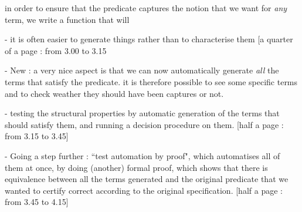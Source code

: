 in order to ensure that the predicate captures the notion that we want for \emph{any} term, we write a function that will 




- it is often easier to generate things rather than to characterise them 
[a quarter of a page : from 3.00 to 3.15

- New : a very nice aspect is that we can now automatically generate \emph{all} the terms that satisfy the predicate. it is therefore possible to see some specific terms and to check weather they should have been captures or not.

- testing the structural properties by automatic generation of the terms that should satisfy them, and running a decision procedure on them.
[half a page : from 3.15 to 3.45]

- Going a step further : ``test automation by proof", which automatises all of them at once, by doing (another) formal proof, which shows that there is equivalence between all the terms generated and the original predicate that we wanted to certify correct according to the original specification.
[half a page : from 3.45 to 4.15]